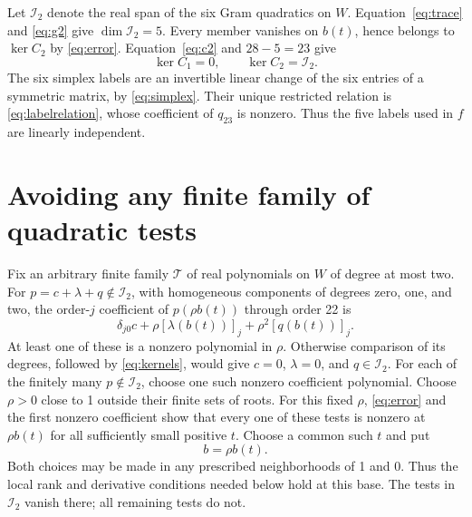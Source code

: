 \documentclass[11pt]{article}
\newcommand{\Ical}{\mathcal I_2}
\begin{document}
Let $\Ical$ denote the real span of the six Gram quadratics on $W$.
Equation~\eqref{eq:trace} and \eqref{eq:g2} give $\dim\Ical=5$.
Every member vanishes on $b(t)$, hence belongs to $\ker C_2$ by
\eqref{eq:error}. Equation~\eqref{eq:c2} and $28-5=23$ give
\begin{equation}\label{eq:kernels}
 \ker C_1=0,\qquad \ker C_2=\Ical.
\end{equation}
The six simplex labels are an invertible linear change of the six entries
of a symmetric matrix, by \eqref{eq:simplex}. Their unique restricted
relation is \eqref{eq:labelrelation}, whose coefficient of $q_{23}$ is
nonzero. Thus the five labels used in $f$ are linearly independent.

\section{Avoiding any finite family of quadratic tests}
Fix an arbitrary finite family $\mathcal T$ of real polynomials on $W$
of degree at most two. For $p=c+\lambda+q\notin\Ical$, with homogeneous
components of degrees zero, one, and two, the order-$j$ coefficient of
$p(\rho b(t))$ through order 22 is
\begin{equation}\label{eq:rho}
 \delta_{j0}c+\rho[\lambda(b(t))]_j+\rho^2[q(b(t))]_j.
\end{equation}
At least one of these is a nonzero polynomial in $\rho$. Otherwise
comparison of its degrees, followed by \eqref{eq:kernels}, would give
$c=0$, $\lambda=0$, and $q\in\Ical$.
For each of the finitely many $p\notin\Ical$, choose one such nonzero
coefficient polynomial. Choose $\rho>0$ close to 1 outside their finite
sets of roots. For this fixed $\rho$, \eqref{eq:error} and the first
nonzero coefficient show that every one of these tests is nonzero at
$\rho b(t)$ for all sufficiently small positive $t$. Choose a common
such $t$ and put
\begin{equation}\label{eq:bscaled}
 b=\rho b(t).
\end{equation}
Both choices may be made in any prescribed neighborhoods of 1 and 0.
Thus the local rank and derivative conditions needed below hold at this
base. The tests in $\Ical$ vanish there; all remaining tests do not.
\end{document}
